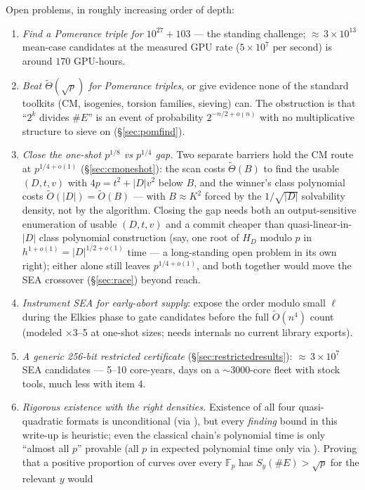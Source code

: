 \documentclass[11pt]{amsart}
\newcommand{\F}{\mathbb{F}}
\newcommand{\Ot}{\widetilde{O}}
\newcommand{\Tt}{\widetilde{\Theta}}
\newcommand{\smoothpart}[2]{S_{#1}(#2)}
\theoremstyle{plain}
\theoremstyle{definition}
\theoremstyle{remark}
\begin{document}
Open problems, in roughly increasing order of depth:
\begin{enumerate}
\item \emph{Find a Pomerance triple for $10^{27}+103$} \cite{DANGER3} --- the standing challenge;
${\approx}\,3\times 10^{13}$ mean-case candidates at the measured GPU rate ($5\times 10^7$ per
second) is around $170$ GPU-hours.
\item \emph{Beat $\Tt(\sqrt p)$ for Pomerance triples}, or give evidence none of the standard toolkits
(CM, isogenies, torsion families, sieving) can.  The obstruction is that ``$2^k$ divides $\#E$'' is an
event of probability $2^{-n/2+o(n)}$ with no multiplicative structure to sieve on
(\S\ref{sec:pomfind}).
\item \emph{Close the one-shot $p^{1/8}$ vs $p^{1/4}$ gap.}  Two separate barriers hold the CM route
at $p^{1/4+o(1)}$ (\S\ref{sec:cmoneshot}): the scan costs $\Tt(B)$ to find the usable $(D, t, v)$ with
$4p = t^2+|D|v^2$ below $B$, and the winner's class polynomial costs $\Ot(|D|) = \Ot(B)$ --- with
$B \approx K^2$ forced by the $1/\sqrt{|D|}$ solvability density, not by the algorithm.  Closing the
gap needs both an output-sensitive enumeration of usable $(D, t, v)$ and a commit cheaper than
quasi-linear-in-$|D|$ class polynomial construction (say, one root of $H_D$ modulo $p$ in
$h^{1+o(1)} = |D|^{1/2+o(1)}$ time --- a long-standing open problem in its own right); either alone
still leaves $p^{1/4+o(1)}$, and both together would move the SEA crossover (\S\ref{sec:race}) beyond
reach.
\item \emph{Instrument SEA for early-abort supply}: expose the order modulo small $\ell$ during the
Elkies phase to gate candidates before the full $\Ot(n^4)$ count (modeled $\times$3--5 at one-shot
sizes; needs internals no current library exports).
\item \emph{A generic 256-bit restricted certificate} (\S\ref{sec:restrictedresults}):
${\approx}\,3\times 10^7$ SEA candidates --- 5--10 core-years, days on a ${\sim}3000$-core fleet with
stock tools, much less with item 4.
\item \emph{Rigorous existence with the right densities.}  Existence of all four quasi-quadratic
formats is unconditional (via \cite{Pom87}), but every \emph{finding} bound in this write-up is
heuristic; even the classical chain's polynomial time is only ``almost all $p$'' provable
\cite{GK86,HB88} (all $p$ in expected polynomial time only via \cite{AH92}).  Proving that a positive
proportion of curves over every $\F_p$ has $\smoothpart{y}{\#E} > \sqrt p$ for the relevant $y$ would

\end{enumerate}
\end{document}
